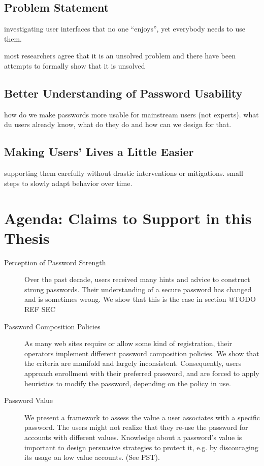 \subsection{Problem Statement}
investigating user interfaces that no one ``enjoys'', yet everybody needs to use them. 

most researchers agree that it is an unsolved problem and there have been attempts to formally show that it is unsolved 

\subsection{Better Understanding of Password Usability}
how do we make passwords more usable for mainstream users (not experts). what du users already know, what do they do and how can we design for that. 

\subsection{Making Users' Lives a Little Easier}
supporting them carefully without drastic interventions or mitigations. small steps to slowly adapt behavior over time. 

\section{Agenda: Claims to Support in this Thesis}

\begin{description}
\item[Perception of Password Strength] Over the past decade, users received many hints and advice to construct strong passwords. Their understanding of a secure password has changed and is sometimes wrong. We show that this is the case in section @TODO REF SEC

\item[Password Composition Policies] As many web sites require or allow some kind of registration, their operators implement different password composition policies. We show that the criteria are manifold and largely inconsistent. Consequently, users approach enrollment with their preferred password, and are forced to apply heuristics to modify the password, depending on the policy in use. 

\item[Password Value] We present a framework to assess the value a user associates with a specific password. The users might not realize that they re-use the password for accounts with different values. Knowledge about a password's value is important to design persuasive strategies to protect it, e.g. by discouraging its usage on low value accounts. (See PST).
\end{description}


